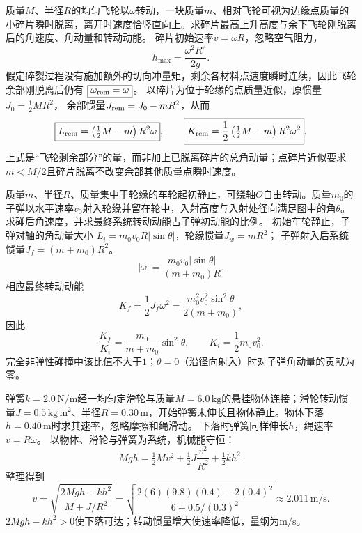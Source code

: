 \problemtext 质量$M$、半径$R$的均匀飞轮以$\omega$转动，一块质量$m$、相对飞轮可视为边缘点质量的小碎片瞬时脱离，离开时速度恰竖直向上。求碎片最高上升高度与余下飞轮刚脱离后的角速度、角动量和转动动能。
\workings
碎片初始速率$v=\omega R$，忽略空气阻力，
\[
\boxed{h_{\max}=\frac{\omega^2R^2}{2g}}.
\]
假定碎裂过程没有施加额外的切向冲量矩，剩余各材料点速度瞬时连续，因此飞轮余部刚脱离后仍有
$\boxed{\omega_{\rm rem}=\omega}$。
以碎片为位于轮缘的点质量近似，原惯量$J_0=\frac12MR^2$，
余部惯量$J_{\rm rem}=J_0-mR^2$，从而
\[
\boxed{L_{\rm rem}=\left(\tfrac12M-m\right)R^2\omega},
\qquad
\boxed{K_{\rm rem}=\frac12\left(\tfrac12M-m\right)R^2\omega^2}.
\]
\crosscheck 上式是“飞轮剩余部分”的量，而非加上已脱离碎片的总角动量；点碎片近似要求$m<M/2$且碎片脱离不改变余部其他质量点瞬时速度。

\problemtext 质量$m$、半径$R$、质量集中于轮缘的车轮起初静止，可绕轴$O$自由转动。质量$m_0$的子弹以水平速率$v_0$射入轮缘并留在轮中，入射高度与入射处径向满足图中的角$\theta$。求碰后角速度，并求最终系统转动动能占子弹初动能的比例。
\workings
初始车轮静止，子弹对轴的角动量大小
$L_i=m_0v_0R|\sin\theta|$，轮缘惯量$J_w=mR^2$；
子弹射入后系统惯量$J_f=(m+m_0)R^2$。
\[
\boxed{|\omega|=\frac{m_0v_0|\sin\theta|}{(m+m_0)R}}.
\]
相应最终转动动能
\[
K_f=\frac12J_f\omega^2
=\frac{m_0^2v_0^2\sin^2\theta}{2(m+m_0)},
\]
因此
\[
\boxed{\frac{K_f}{K_i}=\frac{m_0}{m+m_0}\sin^2\theta},
\qquad K_i=\frac12m_0v_0^2.
\]
\crosscheck 完全非弹性碰撞中该比值不大于$1$；$\theta=0$（沿径向射入）时对子弹角动量的贡献为零。

\problemtext 弹簧$k=2.0\,\mathrm{N/m}$经一均匀定滑轮与质量$M=6.0\,\mathrm{kg}$的悬挂物体连接；滑轮转动惯量$J=0.5\,\mathrm{kg\,m^2}$、半径$R=0.30\,\mathrm m$，开始弹簧未伸长且物体静止。物体下落$h=0.40\,\mathrm m$时求其速率，忽略摩擦和绳滑动。
\workings
下落时弹簧同样伸长$h$，绳速率$v=R\omega$。
以物体、滑轮与弹簧为系统，机械能守恒：
\[
Mgh=\tfrac12Mv^2+\tfrac12J\frac{v^2}{R^2}+\tfrac12kh^2.
\]
整理得到
\[
\boxed{v=\sqrt{\frac{2Mgh-kh^2}{M+J/R^2}}}
=\sqrt{\frac{2(6)(9.8)(0.4)-2(0.4)^2}{6+0.5/(0.3)^2}}
\approx2.011\,\mathrm{m/s}.
\]
\crosscheck $2Mgh-kh^2>0$使下落可达；转动惯量增大使速率降低，量纲为$\mathrm{m/s}$。
